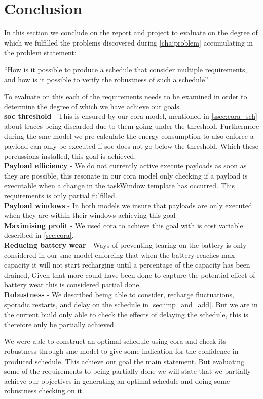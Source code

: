 \chapter{Conclusion} \label{sec:conclusion}
In this section we conclude on the report and project to evaluate on the degree of which we fulfilled the problems discovered during  \cref{cha:problem} accumulating in the problem statement:

\enquote{How is it possible to produce a schedule that consider multiple requirements, and how is it possible to verify the robustness of such a schedule}

To evaluate on this each of the requirements needs to be examined in order to determine the degree of which we have achieve our goals.\\
\textbf{\Gls{soc} threshold} - This is ensured by our \gls{cora} model, mentioned in  \cref{ssec:cora_sch} about traces being discarded due to them going under the threshold. Furthermore during the \gls{smc} model we pre calculate the energy consumption to also enforce a payload can only be executed if \gls{soc} does not go below the threshold.  Which these percussions installed, this goal is achieved.\\
\textbf{Payload efficiency} - We do not currently active execute payloads as soon as they are possible, this resonate in our \gls{cora} model only checking if a payload is executable when a change in the taskWindow template has occurred. This requirements is only partial fulfilled.\\
\textbf{Payload windows} - In both models we insure that payloads are only executed when they are within their windows achieving this goal \\
\textbf{Maximising profit} - We used \gls{cora} to achieve this goal with is cost variable described in  \cref{sec:cora}.\\
\textbf{Reducing battery wear} - Ways of preventing tearing on the battery is only considered in our \gls{smc} model enforcing that when the battery reaches max capacity it will not start recharging until a percentage of the capacity has been drained, Given that more could have been done to capture the potential effect of battery wear this is considered partial done. \\
\textbf{Robustness} - We described being able to consider, recharge fluctuations, sporadic restarts, and delay on the schedule in  \cref{sec:imp_and_add}. But we are in the current build only able to check the effects of delaying the schedule, this is therefore only be partially achieved.

We were able to construct an optimal schedule using \gls{cora} and check its robustness through \gls{smc} model to give some indication for the confidence in produced schedule. This achieve our goal the main statement. But evaluating some of the requirements to being partially done we will state that we partially achieve our objectives in generating an optimal schedule and doing some robustness checking on it.